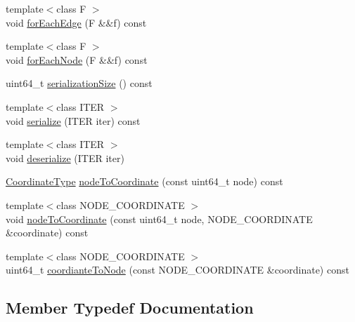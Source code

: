 \begin{DoxyCompactItemize}
\item 
{\footnotesize template$<$class F $>$ }\\void \hyperlink{classnifty_1_1graph_1_1UndirectedGridGraph_3_01DIM_00_01true_01_4_abc96c4bde9f5a06e0f9790362d8217b4}{for\+Each\+Edge} (F \&\&f) const 
\item 
{\footnotesize template$<$class F $>$ }\\void \hyperlink{classnifty_1_1graph_1_1UndirectedGridGraph_3_01DIM_00_01true_01_4_ac2da273d8721f71f46b3083d3ad25803}{for\+Each\+Node} (F \&\&f) const 
\item 
uint64\+\_\+t \hyperlink{classnifty_1_1graph_1_1UndirectedGridGraph_3_01DIM_00_01true_01_4_a6f7fc48b84039c3db37a1deac2d1f838}{serialization\+Size} () const 
\item 
{\footnotesize template$<$class I\+T\+E\+R $>$ }\\void \hyperlink{classnifty_1_1graph_1_1UndirectedGridGraph_3_01DIM_00_01true_01_4_aba7a207a92ef6c7912f714672c3da7df}{serialize} (I\+T\+E\+R iter) const 
\item 
{\footnotesize template$<$class I\+T\+E\+R $>$ }\\void \hyperlink{classnifty_1_1graph_1_1UndirectedGridGraph_3_01DIM_00_01true_01_4_a0b1e57a51d603060ce799156851146cd}{deserialize} (I\+T\+E\+R iter)
\item 
\hyperlink{classnifty_1_1graph_1_1UndirectedGridGraph_3_01DIM_00_01true_01_4_a45f38cce72559c7bdefa3d219486bae4}{Coordinate\+Type} \hyperlink{classnifty_1_1graph_1_1UndirectedGridGraph_3_01DIM_00_01true_01_4_a45f6130be3a7c3ae896018a551203c93}{node\+To\+Coordinate} (const uint64\+\_\+t node) const 
\item 
{\footnotesize template$<$class N\+O\+D\+E\+\_\+\+C\+O\+O\+R\+D\+I\+N\+A\+T\+E $>$ }\\void \hyperlink{classnifty_1_1graph_1_1UndirectedGridGraph_3_01DIM_00_01true_01_4_ae735eb56076d4d656d318474807fc51a}{node\+To\+Coordinate} (const uint64\+\_\+t node, N\+O\+D\+E\+\_\+\+C\+O\+O\+R\+D\+I\+N\+A\+T\+E \&coordinate) const 
\item 
{\footnotesize template$<$class N\+O\+D\+E\+\_\+\+C\+O\+O\+R\+D\+I\+N\+A\+T\+E $>$ }\\uint64\+\_\+t \hyperlink{classnifty_1_1graph_1_1UndirectedGridGraph_3_01DIM_00_01true_01_4_ae0bd0ad13f12c2d52089863bc5c09bf1}{coordiante\+To\+Node} (const N\+O\+D\+E\+\_\+\+C\+O\+O\+R\+D\+I\+N\+A\+T\+E \&coordinate) const 
\end{DoxyCompactItemize}


\subsection{Member Typedef Documentation}
\hypertarget{classnifty_1_1graph_1_1UndirectedGridGraph_3_01DIM_00_01true_01_4_a9779969eb8762908d43eab3d9d3b17b1}{}
